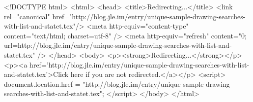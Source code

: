 <!DOCTYPE html>
<html>
<head>
<title>Redirecting...</title>
<link rel="canonical" href="http://blog.jle.im/entry/unique-sample-drawing-searches-with-list-and-statet.tex"/>
<meta http-equiv="content-type" content="text/html; charset=utf-8" />
<meta http-equiv="refresh" content="0; url=http://blog.jle.im/entry/unique-sample-drawing-searches-with-list-and-statet.tex" />
</head>
<body>
  <p><strong>Redirecting...</strong></p>
  <p><a href='http://blog.jle.im/entry/unique-sample-drawing-searches-with-list-and-statet.tex'>Click here if you are not redirected.</a></p>
  <script>
    document.location.href = "http://blog.jle.im/entry/unique-sample-drawing-searches-with-list-and-statet.tex";
  </script>
</body>
</html>
